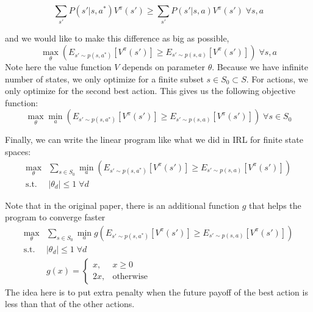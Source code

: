 \documentclass[11pt]{article}
\begin{document}
\begin{equation}
    \sum_{s'}P(s'|s,a^*)V^\pi(s')\geq \sum_{s'}P(s'|s,a)V^\pi(s') \;\forall s,a
\end{equation}

and we would like to make this difference as big as possible,
\begin{equation}
    \max_\theta(E_{s'\sim p(s,a^*)}[V^\pi(s')]\geq E_{s'\sim p(s,a)}[V^\pi(s')]) \;\forall s,a
\end{equation}
Note here the value function $V$ depends on parameter $\theta$. Because we have infinite number of states, we only optimize for a finite subset $s\in S_0 \subset S$. For actions, we only optimize for the second best action. This gives us the following objective function:
\begin{equation}
    \max_\theta\min_a(E_{s'\sim p(s,a^*)}[V^\pi(s')]\geq E_{s'\sim p(s,a)}[V^\pi(s')]) \;\forall s\in S_0
\end{equation}

Finally, we can write the linear program like what we did in IRL for finite state spaces:
\begin{align}
    \max_\theta&\sum_{s\in S_0}\min_a(E_{s'\sim p(s,a^*)}[V^\pi(s')]\geq E_{s'\sim p(s,a)}[V^\pi(s')])  \\
    \text{s.t.} &|\theta_d| \leq 1 \;\forall d
\end{align}

Note that in the original paper, there is an additional function $g$ that helps the program to converge faster
\begin{align}
    \max_\theta&\sum_{s\in S_0}\min_a g(E_{s'\sim p(s,a^*)}[V^\pi(s')]\geq E_{s'\sim p(s,a)}[V^\pi(s')])  \\
    \text{s.t.} &|\theta_d| \leq 1 \;\forall d\\
    &g(x) = 
  \begin{cases}
    x, &  x \geq 0\\
    2x, & \text{otherwise} 
  \end{cases}
\end{align}
The idea here is to put extra penalty when the future payoff of the best action is less than that of the other actions.


{


}


\end{document}
